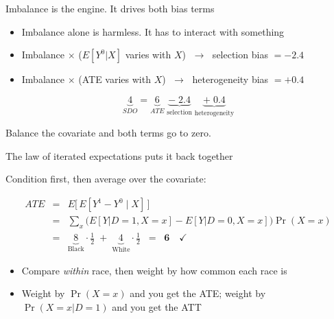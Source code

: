 \documentclass{beamer}
\begin{document}
\begin{frame}{Imbalance is the engine. It drives both bias terms}

\begin{itemize}
\item Imbalance alone is harmless. It has to interact with something
\end{itemize}

\vspace{0.5em}

\begin{itemize}
\item Imbalance $\times$ ($E[Y^0|X]$ varies with $X$) $\;\to\;$ \alert{selection bias} $= -2.4$
\item Imbalance $\times$ (ATE varies with $X$) $\;\to\;$ \alert{heterogeneity bias} $= +0.4$
\end{itemize}

\vspace{0.6em}

$$\underbrace{4}_{SDO} = \underbrace{6}_{ATE} \; \underbrace{-\; 2.4}_{\text{selection}} \; \underbrace{+\; 0.4}_{\text{heterogeneity}}$$

\vspace{0.3em}

Balance the covariate and both terms go to zero.

\end{frame}


\begin{frame}{The law of iterated expectations puts it back together}

Condition first, then average over the covariate:

\begin{eqnarray*}
ATE &=& E\big[\,E[Y^1 - Y^0 \mid X]\,\big] \\
    &=& \sum_x \Big( E[Y|D=1,X=x] - E[Y|D=0,X=x] \Big) \Pr(X=x) \\
    &=& \underbrace{8}_{\text{Black}} \cdot \tfrac{1}{2} \;+\; \underbrace{4}_{\text{White}} \cdot \tfrac{1}{2} \;\;=\;\; \textbf{6} \quad \checkmark
\end{eqnarray*}

\vspace{0.4em}

\begin{itemize}
\item Compare \emph{within} race, then weight by how common each race is
\item Weight by $\Pr(X=x)$ and you get the ATE; weight by $\Pr(X=x|D=1)$ and you get the ATT
\end{itemize}

\end{frame}
\end{document}
